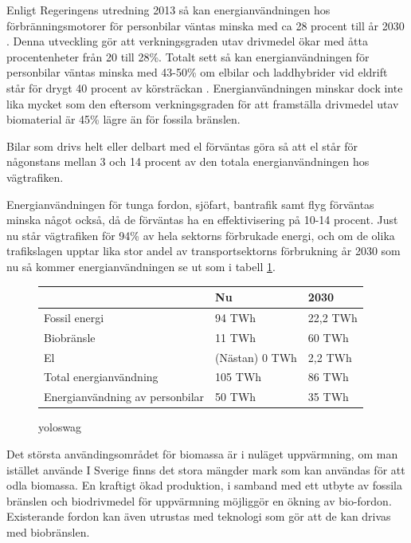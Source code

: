 \documentclass[a4paper,11pt,fleqn, titlepage]{article}
\begin{document}
Enligt Regeringens utredning 2013 så kan energianvändningen hos
förbränningsmotorer för personbilar väntas minska med ca 28 procent till år
2030 \cite{fossilfrihet}. Denna utveckling gör att verkningsgraden utav
drivmedel ökar med åtta procentenheter från 20 till 28\%.  Totalt sett så
kan energianvändningen för personbilar väntas minska med 43-50\% om elbilar
och laddhybrider vid eldrift står för drygt 40 procent av körsträckan
\cite{fossilfrihet}.  Energianvändningen minskar dock inte lika mycket som
den eftersom verkningsgraden för att framställa drivmedel utav biomaterial
är 45\% lägre än för fossila bränslen.

Bilar som drivs helt eller delbart med el förväntas göra så att el står för
någonstans mellan 3 och 14 procent av den totala energianvändningen hos
vägtrafiken.

Energianvändningen för tunga fordon, sjöfart, bantrafik samt flyg förväntas
minska något också, då de förväntas ha en effektivisering på 10-14 procent.
Just nu står vägtrafiken för 94\% av hela sektorns förbrukade energi, och
om de olika trafikslagen upptar lika stor andel av transportsektorns
förbrukning år 2030 som nu så kommer energianvändningen se ut som i tabell
\ref{tab:scen1energi}.

\begin{figure}[h!]
	\begin{center}
	\begin{tabular}{ | l | l | l | }
	\hline
						& Nu		& 2030 \\ \hline
	Fossil energi				& 94 TWh	& 22,2 TWh \\ \hline
	Biobränsle				& 11 TWh	& 60 TWh \\ \hline %
	El					& (Nästan) 0 TWh &  2,2 TWh \\ \hline %
	Total energianvändning		& 105 TWh	& 86 TWh \\ \hline
	Energianvändning av personbilar	& 50 TWh	& 35 TWh \\ \hline
	\end{tabular}
	\caption{yoloswag}
	\label{tab:scen1energi}
\end{center}
\end{figure}



Det största användingsområdet för biomassa är i nuläget uppvärmning, om man istället använde
I Sverige finns det stora mängder mark som kan användas för att odla biomassa. En kraftigt ökad produktion, i samband med ett utbyte av fossila bränslen och biodrivmedel för uppvärmning möjliggör en ökning av bio-fordon. Existerande fordon kan även utrustas med teknologi som gör att de kan drivas med biobränslen.
\end{document}
